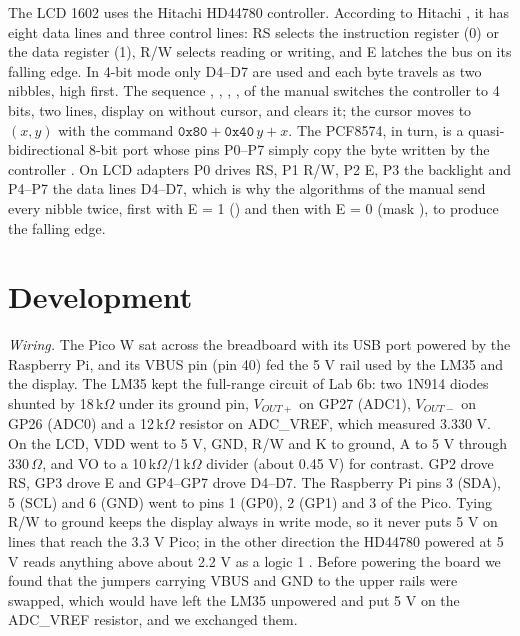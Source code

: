 \documentclass[12pt,letterpaper]{article}
\begin{document}
The LCD 1602 uses the Hitachi HD44780 controller. According to Hitachi \citeyearpar{hitachi1998}, it has eight data lines and three control lines: RS selects the instruction register (0) or the data register (1), R/W selects reading or writing, and E latches the bus on its falling edge. In 4-bit mode only D4--D7 are used and each byte travels as two nibbles, high first. The sequence , , , ,  of the manual switches the controller to 4 bits, two lines, display on without cursor, and clears it; the cursor moves to $(x,y)$ with the command $\mathtt{0x80}+\mathtt{0x40}\,y+x$. The PCF8574, in turn, is a quasi-bidirectional 8-bit port whose pins P0--P7 simply copy the byte written by the controller \citep{nxp2013}. On LCD adapters P0 drives RS, P1 R/W, P2 E, P3 the backlight and P4--P7 the data lines D4--D7, which is why the algorithms of the manual send every nibble twice, first with E = 1 () and then with E = 0 (mask ), to produce the falling edge.

\section{Development}
\emph{Wiring.} The Pico W sat across the breadboard with its USB port powered by the Raspberry Pi, and its VBUS pin (pin 40) fed the 5 V rail used by the LM35 and the display. The LM35 kept the full-range circuit of Lab 6b: two 1N914 diodes shunted by 18\,k$\Omega$ under its ground pin, $V_{OUT+}$ on GP27 (ADC1), $V_{OUT-}$ on GP26 (ADC0) and a 12\,k$\Omega$ resistor on ADC\_VREF, which measured 3.330 V. On the LCD, VDD went to 5 V, GND, R/W and K to ground, A to 5 V through 330\,$\Omega$, and VO to a 10\,k$\Omega$/1\,k$\Omega$ divider (about 0.45 V) for contrast. GP2 drove RS, GP3 drove E and GP4--GP7 drove D4--D7. The Raspberry Pi pins 3 (SDA), 5 (SCL) and 6 (GND) went to pins 1 (GP0), 2 (GP1) and 3 of the Pico. Tying R/W to ground keeps the display always in write mode, so it never puts 5 V on lines that reach the 3.3 V Pico; in the other direction the HD44780 powered at 5 V reads anything above about 2.2 V as a logic 1 \citep{hitachi1998}. Before powering the board we found that the jumpers carrying VBUS and GND to the upper rails were swapped, which would have left the LM35 unpowered and put 5 V on the ADC\_VREF resistor, and we exchanged them.
\end{document}
